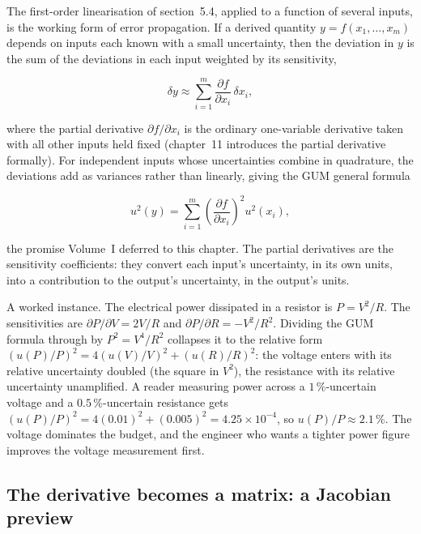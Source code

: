 The first-order linearisation of section~5.4, applied to a function
of several inputs, is the working form of error propagation. If a
derived quantity $y = f(x_{1}, \ldots, x_{m})$ depends on inputs
each known with a small uncertainty, then the deviation in $y$ is
the sum of the deviations in each input weighted by its
sensitivity,

\[
\delta y \approx \sum_{i=1}^{m} \frac{\partial f}{\partial x_{i}}
\, \delta x_{i},
\]

where the partial derivative $\partial f / \partial x_{i}$ is the
ordinary one-variable derivative taken with all other inputs held
fixed (chapter~11 introduces the partial derivative formally). For
independent inputs whose uncertainties combine in quadrature, the
deviations add as variances rather than linearly, giving the GUM
general formula

\[
u^{2}(y) = \sum_{i=1}^{m} \left(\frac{\partial f}{\partial x_{i}}
\right)^{2} u^{2}(x_{i}),
\]

the promise Volume~I deferred to this chapter. The partial
derivatives are the sensitivity coefficients: they convert each
input's uncertainty, in its own units, into a contribution to the
output's uncertainty, in the output's units.

A worked instance. The electrical power dissipated in a resistor is
$P = V^{2}/R$. The sensitivities are $\partial P / \partial V =
2V/R$ and $\partial P / \partial R = -V^{2}/R^{2}$. Dividing the
GUM formula through by $P^{2} = V^{4}/R^{2}$ collapses it to the
relative form $(u(P)/P)^{2} = 4 (u(V)/V)^{2} + (u(R)/R)^{2}$: the
voltage enters with its relative uncertainty doubled (the square in
$V^{2}$), the resistance with its relative uncertainty unamplified.
A reader measuring power across a $1\,\%$-uncertain voltage and a
$0.5\,\%$-uncertain resistance gets $(u(P)/P)^{2} = 4(0.01)^{2} +
(0.005)^{2} = 4.25 \times 10^{-4}$, so $u(P)/P \approx 2.1\,\%$.
The voltage dominates the budget, and the engineer who wants a
tighter power figure improves the voltage measurement first.

\subsection{The derivative becomes a matrix: a Jacobian preview}

